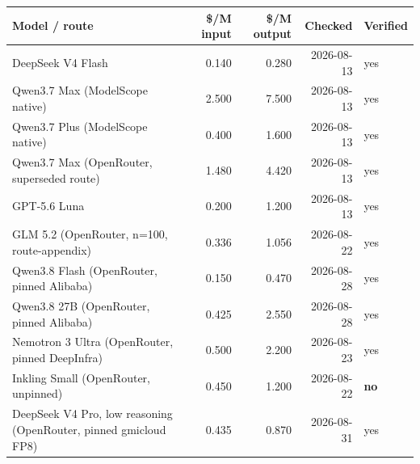 \begin{tabular}{lrrrl}
\toprule
Model / route & \$/M input & \$/M output & Checked & Verified \\
\midrule
DeepSeek V4 Flash & 0.140 & 0.280 & 2026-08-13 & yes \\
Qwen3.7 Max (ModelScope native) & 2.500 & 7.500 & 2026-08-13 & yes \\
Qwen3.7 Plus (ModelScope native) & 0.400 & 1.600 & 2026-08-13 & yes \\
Qwen3.7 Max (OpenRouter, superseded route) & 1.480 & 4.420 & 2026-08-13 & yes \\
GPT-5.6 Luna & 0.200 & 1.200 & 2026-08-13 & yes \\
GLM 5.2 (OpenRouter, n=100, route-appendix) & 0.336 & 1.056 & 2026-08-22 & yes \\
Qwen3.8 Flash (OpenRouter, pinned Alibaba) & 0.150 & 0.470 & 2026-08-28 & yes \\
Qwen3.8 27B (OpenRouter, pinned Alibaba) & 0.425 & 2.550 & 2026-08-28 & yes \\
Nemotron 3 Ultra (OpenRouter, pinned DeepInfra) & 0.500 & 2.200 & 2026-08-23 & yes \\
Inkling Small (OpenRouter, unpinned) & 0.450 & 1.200 & 2026-08-22 & \textbf{no} \\
DeepSeek V4 Pro, low reasoning (OpenRouter, pinned gmicloud FP8) & 0.435 & 0.870 & 2026-08-31 & yes \\
\bottomrule
\end{tabular}

